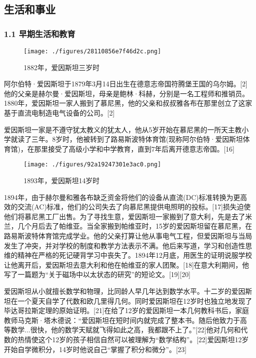 \subsection{生活和事业}
\subsubsection{1.1 早期生活和教育}
\begin{figure}[ht]
\centering
\texttt{[image: ./figures/28110856e7f46d2c.png]}
\caption{1882年，爱因斯坦三岁时} \label{fig_AYST_1}
\end{figure}
阿尔伯特·爱因斯坦于1879年3月14日出生在德意志帝国符腾堡王国的乌尔姆。[2]他的父亲是赫尔曼·爱因斯坦，母亲是鲍林·科赫，分别是一名工程师和推销员。1880年，爱因斯坦一家人搬到了慕尼黑，他的父亲和叔叔雅各布在那里创立了这家基于直流电制造电气设备的公司。[2]

爱因斯坦一家是不遵守犹太教义的犹太人，他从5岁开始在慕尼黑的一所天主教小学就读了三年。8岁时，他被转到了路易斯波特体育馆(现称阿尔伯特·爱因斯坦体育馆)，在那里接受了高级小学和中学教育，直到7年后离开德意志帝国。[16]
\begin{figure}[ht]
\centering
\texttt{[image: ./figures/92a19247301e3ac0.png]}
\caption{1893年，爱因斯坦14岁时} \label{fig_AYST_2}
\end{figure}
1894年，由于赫尔曼和雅各布缺乏资金将他们的设备从直流(DC)标准转换为更高效的交流(AC)标准，他们的公司失去了向慕尼黑提供电照明的投标。[17]损失迫使他们将慕尼黑工厂出售。为了寻找生意，爱因斯坦一家搬到了意大利，先是去了米兰，几个月后去了帕维亚。当全家搬到帕维亚时，15岁的爱因斯坦留在慕尼黑，在路易斯波特体育馆完成学业。他的父亲打算让他从事电气工程，但爱因斯坦与当局发生了冲突，并对学校的制度和教学方法表示不满。他后来写道，学习和创造性思维的精神在严格的死记硬背学习中丧失了。1894年12月底，用医生的证明说服学校让他离开后，爱因斯坦去意大利和他在帕维亚的家人团聚。[18]在意大利期间，他写了一篇题为“关于磁场中以太状态的研究”的短论文。[19][20]

爱因斯坦从小就擅长数学和物理，比同龄人早几年达到数学水平。十二岁的爱因斯坦在一个夏天自学了代数和欧几里得几何。同时爱因斯坦在12岁时也独立地发现了毕达哥拉斯定理的原始证明。[21]在给了12岁的爱因斯坦一本几何教科书后，家庭教师马克斯·塔木德说：“爱因斯坦在短时间内就完成了整本书。随后他致力于高等数学...很快，他的数学天赋就飞得如此之高，我都跟不上了。”[22]他对几何和代数的热情使这个12岁的孩子相信自然可以被理解为“数学结构”。[22]爱因斯坦12岁开始自学微积分，14岁时他说自己“掌握了积分和微分”。[23]

